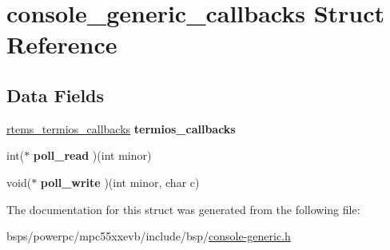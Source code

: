 \hypertarget{structconsole__generic__callbacks}{}\section{console\+\_\+generic\+\_\+callbacks Struct Reference}
\label{structconsole__generic__callbacks}
\subsection*{Data Fields}
\begin{DoxyCompactItemize}
\item 
\mbox{\label{structconsole__generic__callbacks_ac3bd7f7edc9da28ac3db452dcccb87de}} 
\mbox{\hyperlink{structrtems__termios__callbacks}{rtems\+\_\+termios\+\_\+callbacks}} {\bfseries termios\+\_\+callbacks}
\item 
\mbox{\label{structconsole__generic__callbacks_a3fc756743a60368505289ff3116c8ddb}} 
int($\ast$ {\bfseries poll\+\_\+read} )(int minor)
\item 
\mbox{\label{structconsole__generic__callbacks_a40d13966a947926e6130719b8e715cb9}} 
void($\ast$ {\bfseries poll\+\_\+write} )(int minor, char c)
\end{DoxyCompactItemize}


The documentation for this struct was generated from the following file\+:\begin{DoxyCompactItemize}
\item 
bsps/powerpc/mpc55xxevb/include/bsp/\mbox{\hyperlink{console-generic_8h}{console-\/generic.\+h}}\end{DoxyCompactItemize}

